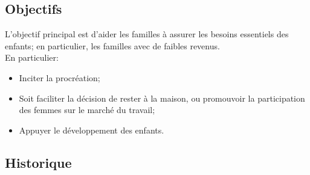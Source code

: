 \documentclass[10pt, french]{article}
\begin{document}
\begin{multicols*}{3}
\subsection*{Objectifs}
L'objectif principal est d'aider les familles à assurer les besoins essentiels des enfants; en particulier, les familles avec de faibles revenus.\\

En particulier:
\begin{itemize}[leftmargin = *]
	\item	Inciter la procréation;
	\item	Soit faciliter la décision de rester à la maison, ou promouvoir la participation des femmes sur le marché du travail;
	\item	Appuyer le développement des enfants.
\end{itemize}

\subsection*{Historique}


\end{multicols*}
\end{document}
